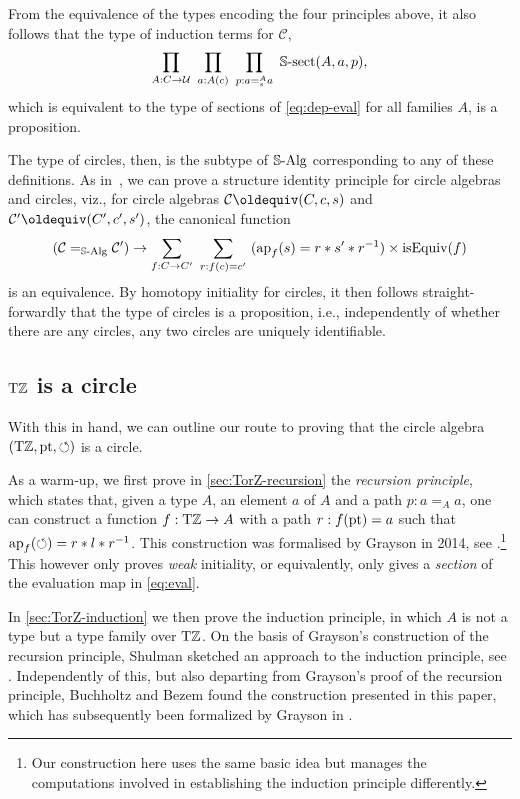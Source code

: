 \documentclass[a4paper,12pt]{amsart}
\begin{document}
From the equivalence of the types encoding the four principles above,
it also follows that the type of induction terms
for $\mathcal C$,
\begin{equation}
  \label{eq:circle-induction-gen}
  \prod_{A: C\to\mathcal{U}}~
  \prod_{a: A(c)}~
  \prod_{p: a=^A_s a}~
  \mathop{\mathbb{S}\textrm{-}\mathrm{sect}}(A,a,p),
\end{equation}
which is equivalent to the type of sections of \eqref{eq:dep-eval}
for all families $A$, is a proposition.

The type of circles, then, is the subtype of $\mathord{\mathbb{S}\textup{-}\mathrm{Alg}}$
corresponding to any of these definitions.
As in~\cite[Sec.~9.8]{hottbook},
we can prove a structure identity principle for circle algebras and circles,
viz., for circle algebras $\mathcal C\jdeq(C,c,s)$ and
$\mathcal C'\jdeq(C',c',s')$, the canonical function
\[
  (\mathcal C =_{\mathord{\mathbb{S}\textup{-}\mathrm{Alg}}} \mathcal C')
  \to
  \sum_{f : C \to C'}~\sum_{r:f(c)=c'}~(\mathop{{\mathrm{ap}}_{f}}(s)=r * s' * r^{-1})
  \times \mathrm{isEquiv}(f)
\]
is an equivalence.
By homotopy initiality for circles,
it then follows straight-forwardly that the type of circles
is a proposition, i.e.,
independently of whether there are any circles,
any two circles are uniquely identifiable.

\subsection{${\mathrm{T}\mathbb{Z}}$ is a circle}\label{sec:TorZ-circle}

With this in hand, we can outline our route to proving
that the circle algebra $({\mathrm{T}\mathbb{Z}},{\mathord{\mathrm{pt}}},{\circlearrowleft})$ is a circle.

As a warm-up, we first prove in \cref{sec:TorZ-recursion}
the \emph{recursion principle},
which states that, given a type $A$, an element $a$ of $A$ and a
path $p:a=_A a$, one can construct a function $f:{\mathrm{T}\mathbb{Z}}\to A$
with a path $r:f({\mathord{\mathrm{pt}}})=a$ such that $\mathop{{\mathrm{ap}}_{f}}({\circlearrowleft})=r * l * r^{-1}$.
This construction was formalised by Grayson
in 2014, see \cite{circlerec-Dan}.\footnote{Our construction here uses the
same basic idea but manages the computations involved in establishing the
induction principle differently.}
This however only proves \emph{weak} initiality, or equivalently,
only gives a \emph{section} of the evaluation map in \eqref{eq:eval}.

In \cref{sec:TorZ-induction} we then prove the induction principle,
in which $A$ is not a type but a type family over ${\mathrm{T}\mathbb{Z}}$.
On the basis of Grayson's construction of the recursion principle,
Shulman sketched an approach to the induction principle, see \cite{circleind-Mike}.
Independently of this, but also departing from Grayson's proof of the
recursion principle, Buchholtz and Bezem found the construction
presented in this paper, which has subsequently been formalized
by Grayson \cite{circleind-Dan,circleind-Dan-theorem} in \UniMath.
\end{document}
